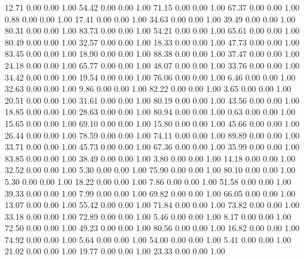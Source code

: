    12.71   0.00   0.00   1.00
   54.42   0.00   0.00   1.00
   71.15   0.00   0.00   1.00
   67.37   0.00   0.00   1.00
    0.88   0.00   0.00   1.00
   17.41   0.00   0.00   1.00
   34.63   0.00   0.00   1.00
   39.49   0.00   0.00   1.00
   80.31   0.00   0.00   1.00
   83.73   0.00   0.00   1.00
   54.21   0.00   0.00   1.00
   65.61   0.00   0.00   1.00
   80.49   0.00   0.00   1.00
   32.57   0.00   0.00   1.00
   18.33   0.00   0.00   1.00
   47.73   0.00   0.00   1.00
   83.45   0.00   0.00   1.00
   18.90   0.00   0.00   1.00
   88.38   0.00   0.00   1.00
   37.47   0.00   0.00   1.00
   24.18   0.00   0.00   1.00
   65.77   0.00   0.00   1.00
   48.07   0.00   0.00   1.00
   33.76   0.00   0.00   1.00
   34.42   0.00   0.00   1.00
   19.54   0.00   0.00   1.00
   76.06   0.00   0.00   1.00
    6.46   0.00   0.00   1.00
   32.63   0.00   0.00   1.00
    9.86   0.00   0.00   1.00
   82.22   0.00   0.00   1.00
    3.65   0.00   0.00   1.00
   20.51   0.00   0.00   1.00
   31.61   0.00   0.00   1.00
   80.19   0.00   0.00   1.00
   43.56   0.00   0.00   1.00
   18.85   0.00   0.00   1.00
   28.63   0.00   0.00   1.00
   80.94   0.00   0.00   1.00
    0.63   0.00   0.00   1.00
   15.65   0.00   0.00   1.00
   69.10   0.00   0.00   1.00
   15.80   0.00   0.00   1.00
   45.66   0.00   0.00   1.00
   26.44   0.00   0.00   1.00
   78.59   0.00   0.00   1.00
   74.11   0.00   0.00   1.00
   89.89   0.00   0.00   1.00
   33.71   0.00   0.00   1.00
   45.73   0.00   0.00   1.00
   67.36   0.00   0.00   1.00
   35.99   0.00   0.00   1.00
   83.85   0.00   0.00   1.00
   38.49   0.00   0.00   1.00
    3.80   0.00   0.00   1.00
   14.18   0.00   0.00   1.00
   32.52   0.00   0.00   1.00
    5.30   0.00   0.00   1.00
   75.90   0.00   0.00   1.00
   80.10   0.00   0.00   1.00
    5.30   0.00   0.00   1.00
   18.22   0.00   0.00   1.00
    7.86   0.00   0.00   1.00
   51.58   0.00   0.00   1.00
   39.33   0.00   0.00   1.00
    7.99   0.00   0.00   1.00
   69.82   0.00   0.00   1.00
   66.05   0.00   0.00   1.00
   13.07   0.00   0.00   1.00
   55.42   0.00   0.00   1.00
   71.84   0.00   0.00   1.00
   73.82   0.00   0.00   1.00
   33.18   0.00   0.00   1.00
   72.89   0.00   0.00   1.00
    5.46   0.00   0.00   1.00
    8.17   0.00   0.00   1.00
   72.50   0.00   0.00   1.00
   49.23   0.00   0.00   1.00
   80.56   0.00   0.00   1.00
   16.82   0.00   0.00   1.00
   74.92   0.00   0.00   1.00
    5.64   0.00   0.00   1.00
   54.00   0.00   0.00   1.00
    5.41   0.00   0.00   1.00
   21.02   0.00   0.00   1.00
   19.77   0.00   0.00   1.00
   23.33   0.00   0.00   1.00
